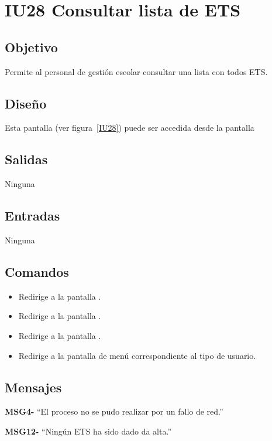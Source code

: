 
\section{IU28 Consultar lista de ETS}
\subsection{Objetivo}
    Permite al personal de gestión escolar consultar una lista con todos ETS.
\subsection{Diseño}
    Esta pantalla  (ver figura~\ref{IU28}) puede ser accedida desde la pantalla 

\subsection{Salidas}
Ninguna
\subsection{Entradas}
Ninguna
\subsection{Comandos}
\begin{itemize}
    \item {} Redirige a la pantalla .
    \item {} Redirige a la pantalla .
    \item {} Redirige a la pantalla .
    \item {} Redirige a la pantalla de menú correspondiente al tipo de usuario.
    
\end{itemize}

\subsection{Mensajes}

\begin{Citemize}
    \item {\bf MSG4-}  ``El proceso no se pudo realizar por un fallo de red.''
    \item {\bf MSG12-}  ``Ningún ETS ha sido dado da alta.''
\end{Citemize}

